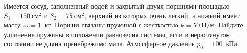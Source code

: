 	Имеется сосуд, заполненный водой и закрытый двумя поршнями площадью $S_1 = 150~\text{см}^2$ и $S_2 = 75~\text{см}^2$, верхний из которых очень легкий, а нижний имеет массу $m = 1$~кг. Поршни связаны пружиной с жесткостью $k = 50~\text{Н/м}$. Найдите удлинение пружины в положении равновесия системы, если в нерастянутом состоянии ее длина пренебрежимо мала. Атмосферное давление $p_0 = 100$~кПа.